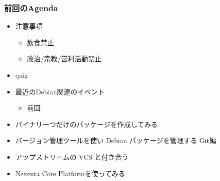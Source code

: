 \documentclass[cjk,dvipdfmx,12pt]{beamer}
\begin{document}
\begin{frame}
 \frametitle{前回のAgenda}
\begin{minipage}[t]{0.45\hsize}
  \begin{itemize}
  \item 注意事項
	\begin{itemize}
	 \item 飲食禁止
	 \item 政治/宗教/営利活動禁止
	\end{itemize}
  \item quiz
  \item 最近のDebian関連のイベント
	\begin{itemize}
	 \item 前回 
	\end{itemize}
 \end{itemize}
\end{minipage} 
\begin{minipage}[t]{0.45\hsize}
 \begin{itemize}
  \item バイナリ一つだけのパッケージを作成してみる
  \item バージョン管理ツールを使い Debian パッケージを管理する Git編
  \item アップストリームの VCS と付き合う
  \item Nexenta Core Platformを使ってみる
 \end{itemize}
\end{minipage}
\end{frame}
\end{document}
